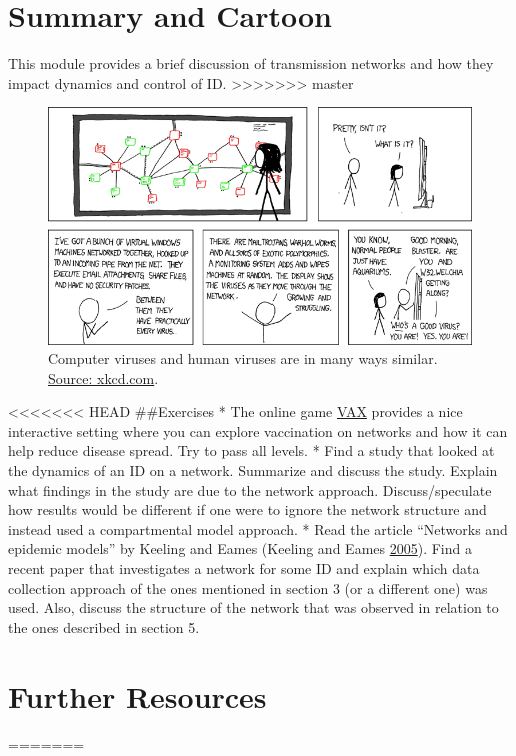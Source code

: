 \documentclass[]{book}
\theoremstyle{definition}
\theoremstyle{definition}
\theoremstyle{definition}
\theoremstyle{remark}
\begin{document}
\section{Summary and Cartoon}\label{summary-and-cartoon-17}

This module provides a brief discussion of transmission networks and how
they impact dynamics and control of ID.
>>>>>>> master

\begin{figure}
\centering
\includegraphics{./images/xkcd-network.png}
\caption{\label{fig:xkcdnetwork}Computer viruses and human viruses are in
many ways similar. \href{https://xkcd.com/350/}{Source: xkcd.com}.}
\end{figure}

<<<<<<< HEAD
\#\#Exercises * The online game \href{http://vax.herokuapp.com/}{VAX}
provides a nice interactive setting where you can explore vaccination on
networks and how it can help reduce disease spread. Try to pass all
levels. * Find a study that looked at the dynamics of an ID on a
network. Summarize and discuss the study. Explain what findings in the
study are due to the network approach. Discuss/speculate how results
would be different if one were to ignore the network structure and
instead used a compartmental model approach. * Read the article
``Networks and epidemic models'' by Keeling and Eames (Keeling and Eames
\protect\hyperlink{ref-keeling05}{2005}). Find a recent paper that
investigates a network for some ID and explain which data collection
approach of the ones mentioned in section 3 (or a different one) was
used. Also, discuss the structure of the network that was observed in
relation to the ones described in section 5.

\hypertarget{further-resources-11}{%
\section{Further Resources}\label{further-resources-11}}
=======
\end{document}

